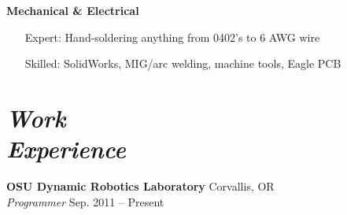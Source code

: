 \documentclass[10pt,letterpaper,margin]{res}
\begin{document}
\begin{resume}
{\bf Mechanical \& Electrical}\vspace{0.2em}

\begin{itemize}
	\setlength{\itemindent}{3em}
	\item[Expert:] Hand-soldering anything from 0402's to 6 AWG wire
	\item[Skilled:] SolidWorks, MIG/arc welding, machine tools, Eagle PCB
\end{itemize}



\section{\large\itshape Work \\ Experience}

% 


{\bf OSU Dynamic Robotics Laboratory} \hfill {\color{lightgray} Corvallis, OR} \\
{\it Programmer} \hfill {\color{lightgray} Sep. 2011 -- Present}\vspace{0.2em}


\end{resume}
\end{document}
